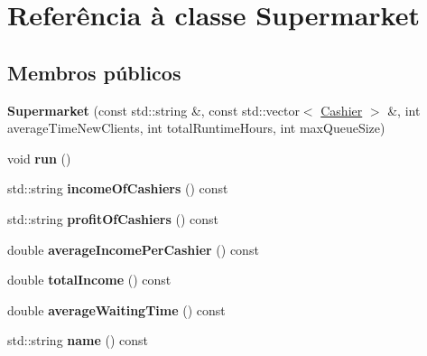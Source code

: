\hypertarget{classSupermarket}{\section{Referência à classe Supermarket}
\label{d7/de9/classSupermarket}
}
\subsection*{Membros públicos}
\begin{DoxyCompactItemize}
\item 
\hypertarget{classSupermarket_a22e6a70fb8213396670c484c6d2e41b3}{{\bfseries Supermarket} (const std\-::string \&, const std\-::vector$<$ \hyperlink{classCashier}{Cashier} $>$ \&, int average\-Time\-New\-Clients, int total\-Runtime\-Hours, int max\-Queue\-Size)}\label{d7/de9/classSupermarket_a22e6a70fb8213396670c484c6d2e41b3}

\item 
\hypertarget{classSupermarket_af2807840b2e04b8988f359d9e34960ea}{void {\bfseries run} ()}\label{d7/de9/classSupermarket_af2807840b2e04b8988f359d9e34960ea}

\item 
\hypertarget{classSupermarket_a3cb0363d56004ae5f42863d00bb952da}{std\-::string {\bfseries income\-Of\-Cashiers} () const }\label{d7/de9/classSupermarket_a3cb0363d56004ae5f42863d00bb952da}

\item 
\hypertarget{classSupermarket_a2e35d76f55bf6b5669b5101a2d7ebc93}{std\-::string {\bfseries profit\-Of\-Cashiers} () const }\label{d7/de9/classSupermarket_a2e35d76f55bf6b5669b5101a2d7ebc93}

\item 
\hypertarget{classSupermarket_ab66a7fa61f23cc679011305fa2b5688f}{double {\bfseries average\-Income\-Per\-Cashier} () const }\label{d7/de9/classSupermarket_ab66a7fa61f23cc679011305fa2b5688f}

\item 
\hypertarget{classSupermarket_a300fa556a29dc813bc29647df30d0cc3}{double {\bfseries total\-Income} () const }\label{d7/de9/classSupermarket_a300fa556a29dc813bc29647df30d0cc3}

\item 
\hypertarget{classSupermarket_aa4ee29cd9ef76a00622dcc9afd409efd}{double {\bfseries average\-Waiting\-Time} () const }\label{d7/de9/classSupermarket_aa4ee29cd9ef76a00622dcc9afd409efd}

\item 
\hypertarget{classSupermarket_aad1cbadfc661d7097aa8e45b43a6de3c}{std\-::string {\bfseries name} () const }\label{d7/de9/classSupermarket_aad1cbadfc661d7097aa8e45b43a6de3c}


\end{DoxyCompactItemize}
